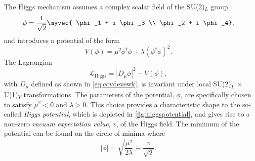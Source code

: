 
The Higgs mechanism assumes a complex scalar field of the SU(2)$_L$ group,
\begin{equation}
  \phi = \frac{1}{\sqrt{2}} \myvec { \phi_1 + i \phi_3 \\ \phi_2 + i \phi_4},
\end{equation}
and introduces a potential of the form
\begin{equation}
  V(\phi) = \mu^2\phi^\dagger\phi + \lambda \left(\phi^\dagger\phi \right)^2.
  \label{eq:higgspotential}
\end{equation}
The Lagrangian 
\begin{equation}
  \mathcal{L}_{\text{Higgs}} = |D_\mu\phi|^2 - V(\phi), %
  \label{eq:lagrangianhiggs}
\end{equation}
with $D_\mu$ defined as shown in \cref{eq:covdevewk}, is invariant under local SU(2)$_L$ $\times$ U(1)$_Y$ transformations.
The parameters of the potential, $\phi$, are specifically chosen to satisfy $\mu^2 < 0$ and $\lambda > 0$.
This choice provides a characteristic shape to the so-called \emph{Higgs potential}, which is depicted in \cref{fig:higgspotential}, and gives rise to a non-zero \emph{vacuum expectation value}, $v$, of the Higgs field.
The minimum of the potential can be found on the circle of minima where
\begin{equation}
  |\phi| = \sqrt{ \frac{\mu^2}{2\lambda} } \equiv \frac{ v }{\sqrt{2}}.
  \label{eq:higgsminima}
\end{equation}
